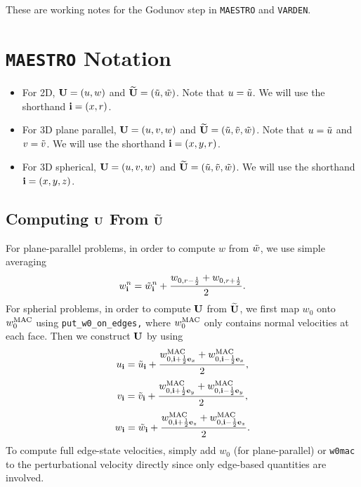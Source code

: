 These are working notes for the Godunov step in {\tt MAESTRO} 
and {\tt VARDEN}.

\section{{\tt MAESTRO} Notation}
\begin{itemize}
\item For 2D, ${\bf U} = (u,w)$ and $\widetilde{{\bf U}} = (\tilde{u},\tilde{w})$.  
  Note that $u = \tilde{u}$.  We will use the shorthand ${\bf i} = (x,r)$.
\item For 3D plane parallel, ${\bf U} = (u,v,w)$
  and $\widetilde{{\bf U}} = (\tilde{u},\tilde{v},\tilde{w})$.  Note that $u = \tilde{u}$ and $v = \tilde{v}$.
  We will use the shorthand ${\bf i} = (x,y,r)$.
\item For 3D spherical, ${\bf U} = (u,v,w)$
  and $\widetilde{{\bf U}} = (\tilde{u},\tilde{v},\tilde{w})$.  We will use the shorthand 
  ${\bf i} = (x,y,z)$.
\end{itemize}
\subsection{Computing ${\bf U}$ From $\widetilde{{\bf U}}$}
For plane-parallel problems, in order to compute $w$ from 
$\tilde{w}$, we use simple averaging
\begin{equation}
w_{{\bf i}}^n = \tilde{w}_{{\bf i}}^n + \frac{w_{0,r-\frac{1}{2}} + w_{0,r+\frac{1}{2}}}{2}.
\end{equation}
For spherial problems, in order to compute ${\bf U}$ from $\widetilde{{\bf U}}$, 
we first map $w_0$ onto $w_0^{\rm MAC}$ using {\tt put\_w0\_on\_edges,}
 where $w_0^{\rm MAC}$ only contains normal velocities at each face.  
Then we construct ${\bf U}$ by using
\begin{equation}
u_{{\bf i}} = \tilde{u}_{{\bf i}} + \frac{w_{0,{\bf i}+\frac{1}{2}{\bf e}_x}^{\rm MAC} + w_{0,{\bf i}-\frac{1}{2}{\bf e}_x}^{\rm MAC}}{2},
\end{equation}
\begin{equation}
v_{{\bf i}} = \tilde{v}_{{\bf i}} + \frac{w_{0,{\bf i}+\frac{1}{2}{\bf e}_y}^{\rm MAC} + w_{0,{\bf i}-\frac{1}{2}{\bf e}_y}^{\rm MAC}}{2},
\end{equation}
\begin{equation}
w_{{\bf i}} = \tilde{w}_{{\bf i}} + \frac{w_{0,{\bf i}+\frac{1}{2}{\bf e}_z}^{\rm MAC} + w_{0,{\bf i}-\frac{1}{2}{\bf e}_z}^{\rm MAC}}{2}.
\end{equation}
To compute full edge-state velocities, simply add $w_0$ 
(for plane-parallel) or {\tt w0mac} to the perturbational
velocity directly since only edge-based quantities are involved.

